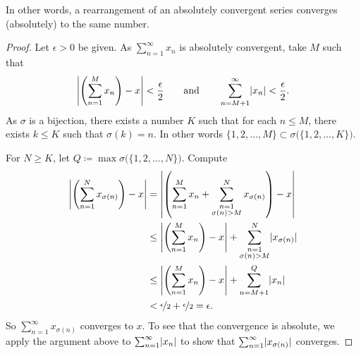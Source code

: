 In other words,
a rearrangement of an absolutely convergent series converges (absolutely)
to the same number.

\begin{proof}
Let $\epsilon > 0$ be given.  As $\sum_{n=1}^\infty x_n$ is absolutely convergent, take $M$ such that
\begin{equation*}
\left\lvert {\left(\sum_{n=1}^M x_n \right) - x} \right\rvert < \frac{\epsilon}{2}
\qquad \text{and} \qquad
\sum_{n=M+1}^\infty \lvert {x_n} \rvert < \frac{\epsilon}{2} .
\end{equation*}
As $\sigma$ is a bijection,
there exists a number $K$ such that for each
$n \leq M$, there exists $k \leq K$ such that $\sigma(k) = n$.
In other words
$\{ 1,2,\ldots,M \} \subset \sigma\bigl(\{ 1,2,\ldots,K \} \bigr)$.

For $N \geq K$, let $Q \coloneqq \max \sigma\bigl(\{ 1,2,\ldots,N \}\bigr)$.
Compute
\begin{equation*}
\begin{split}
\left\lvert {\left( \sum_{n=1}^N x_{\sigma(n)} \right) - x} \right\rvert
& =
\left\lvert { \left( \sum_{n=1}^M x_n
+
\sum_{\substack{n=1\\\sigma(n) > M}}^N x_{\sigma(n)} \right) - x} \right\rvert
\\
& \leq
\left\lvert { \left( \sum_{n=1}^M x_n \right) - x} \right\rvert
+
\sum_{\substack{n=1\\\sigma(n) > M}}^N \lvert {x_{\sigma(n)}} \rvert
\\
& \leq
\left\lvert { \left( \sum_{n=1}^M x_n \right) - x} \right\rvert
+
\sum_{n=M+1}^Q \lvert {x_{n}} \rvert
\\
& < \nicefrac{\epsilon}{2} + \nicefrac{\epsilon}{2} = \epsilon .
\end{split}
\end{equation*}
So 
$\sum_{n=1}^\infty x_{\sigma(n)}$ converges to $x$.  To see that the convergence
is absolute, we apply the argument above to $\sum_{n=1}^\infty \lvert {x_n} \rvert$ to show
that $\sum_{n=1}^\infty \lvert {x_{\sigma(n)}} \rvert$ converges.
\end{proof}

